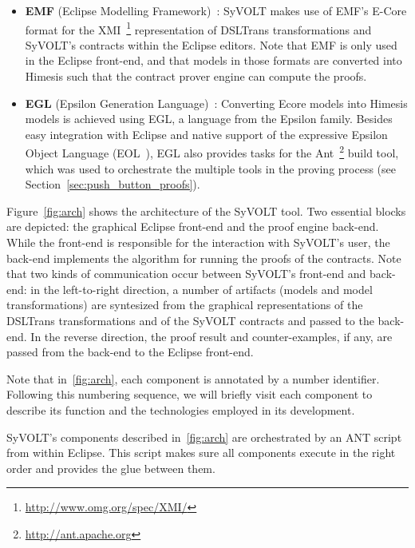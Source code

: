 \begin{itemize}
  \item \textbf{EMF} (Eclipse Modelling Framework)~\cite{}: SyVOLT makes use of
  EMF's E-Core format for the XMI~\footnote{\url{http://www.omg.org/spec/XMI/}} representation of DSLTrans transformations
  and SyVOLT's contracts within the Eclipse editors. Note that EMF is only used
  in the Eclipse front-end, and that models in those formats are converted into
  Himesis such that the contract prover engine can compute the proofs.\\
  \item \textbf{EGL} (Epsilon Generation Language)~\cite{}: Converting Ecore
  models into Himesis models is achieved using EGL, a language from the Epsilon
  family. Besides easy integration with Eclipse and native support of the expressive
Epsilon Object Language (EOL~\cite{Kolovos}), EGL also provides tasks for the
Ant~\footnote{\url{http://ant.apache.org}} build tool, which was used to
orchestrate the multiple tools in the proving process (see
Section~\ref{sec:push_button_proofs}).\\
\end{itemize}


Figure~\ref{fig:arch} shows the architecture of the SyVOLT tool. Two essential
blocks are depicted: the graphical Eclipse front-end and the proof engine
back-end. While the front-end is responsible for the interaction with SyVOLT's
user, the back-end implements the algorithm for running the proofs of the contracts. Note
that two kinds of communication occur between SyVOLT's front-end and back-end:
in the left-to-right direction, a number of artifacts (models and model
transformations) are syntesized from the graphical representations of the
DSLTrans transformations and of the SyVOLT contracts and passed to the
back-end.
In the reverse direction, the proof result and counter-examples, if any, are
passed from the back-end to the Eclipse front-end.

Note that in~\ref{fig:arch}, each component is annotated by a number identifier.
Following this numbering sequence, we will briefly visit each component
to describe its function and the technologies employed in its development.

SyVOLT's components described in~\ref{fig:arch} are orchestrated by an ANT
script from within Eclipse. This script makes sure all components execute in the
right order and provides the glue between them.


